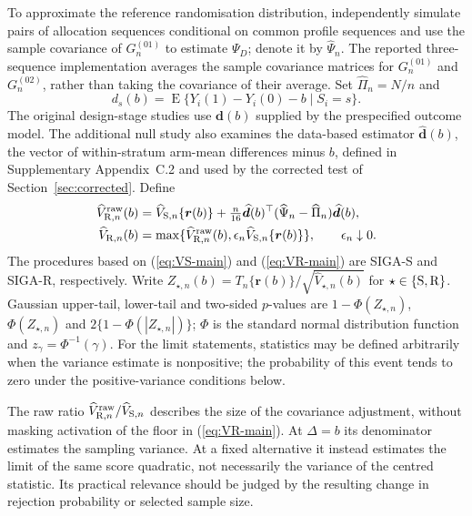 \documentclass[12pt,a4paper]{article}
\theoremstyle{definition}
\newcommand{\E}{\operatorname E}
\begin{document}
To approximate the reference randomisation distribution, independently simulate pairs of allocation sequences conditional on common profile sequences and use the sample covariance of $G_n^{(01)}$ to estimate $\Psi_D$; denote it by $\widehat\Psi_n$. The reported three-sequence implementation averages the sample covariance matrices for $G_n^{(01)}$ and $G_n^{(02)}$, rather than taking the covariance of their average. Set $\widehat\Pi_n=N/n$ and
\[
 d_s(b)=\E\{Y_i(1)-Y_i(0)-b\mid S_i=s\}.
\]
The original design-stage studies use $\bm d(b)$ supplied by the prespecified outcome model. The additional null study also examines the data-based estimator $\widehat{\bm d}(b)$, the vector of within-stratum arm-mean differences minus $b$, defined in Supplementary Appendix~C.2 and used by the corrected test of Section~\ref{sec:corrected}. Define
\begin{align}\label{eq:VRraw-main}
 \widehat V_{{\rm R},n}^{\rm raw}(b)
 &=\widehat V_{{\rm S},n}\{\bm r(b)\}
   +\tfrac n{16}\widehat{\bm d}(b)^\top
             (\widehat\Psi_n-\widehat\Pi_n)\widehat{\bm d}(b),\\
 \widehat V_{{\rm R},n}(b)
 &=\max\{\widehat V_{{\rm R},n}^{\rm raw}(b),
               \epsilon_n\widehat V_{{\rm S},n}\{\bm r(b)\}\},
 \qquad \epsilon_n\downarrow0.\label{eq:VR-main}
\end{align}
The procedures based on (\ref{eq:VS-main}) and (\ref{eq:VR-main}) are SIGA-S and SIGA-R, respectively. Write $Z_{\star,n}(b)=T_n\{\bm r(b)\}/\sqrt{\widehat V_{\star,n}(b)}$ for $\star\in\{{\rm S},{\rm R}\}$. Gaussian upper-tail, lower-tail and two-sided $p$-values are $1-\Phi(Z_{\star,n})$, $\Phi(Z_{\star,n})$ and $2\{1-\Phi(|Z_{\star,n}|)\}$; $\Phi$ is the standard normal distribution function and $z_\gamma=\Phi^{-1}(\gamma)$. For the limit statements, statistics may be defined arbitrarily when the variance estimate is nonpositive; the probability of this event tends to zero under the positive-variance conditions below.

The raw ratio $\widehat V_{{\rm R},n}^{\rm raw}/\widehat V_{{\rm S},n}$ describes the size of the covariance adjustment, without masking activation of the floor in (\ref{eq:VR-main}). At $\Delta=b$ its denominator estimates the sampling variance. At a fixed alternative it instead estimates the limit of the same score quadratic, not necessarily the variance of the centred statistic. Its practical relevance should be judged by the resulting change in rejection probability or selected sample size.
\end{document}
